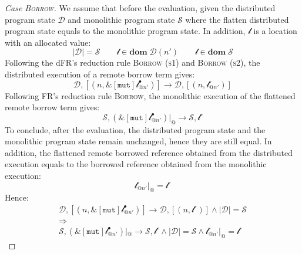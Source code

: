 \begin{proof}[Case \textsc{\emph{Borrow}}]
We assume that before the evaluation, given the distributed program state $\mathcal{D}$ and monolithic program state $\mathcal{S}$ where the flatten distributed program state equals to the monolithic program state. In addition, $\mathscr{l}$ is a location with an allocated value:
\[
|\mathcal{D}| = \mathcal{S} \quad\quad \mathscr{l} \in \textbf{dom}\; \mathcal{D}(n') \quad\quad \mathscr{l} \in \textbf{dom}\; \mathcal{S}
\]
Following the dFR's reduction rule \textsc{Borrow (s1)} and \textsc{Borrow (s2)}, the distributed execution of a remote borrow term gives:
\[
\mathcal{D}, [(n, \&[\texttt{mut}]\mathscr{l}^\bullet_{@n'})] \longrightarrow \mathcal{D}, [(n, \mathscr{l}^\circ_{@n'})]
\]
Following FR's reduction rule \textsc{Borrow}, the monolithic execution of the flattened remote borrow term gives:
\[
\mathcal{S}, (\&[\texttt{mut}]\mathscr{l}^\bullet_{@n'})|_@ \longrightarrow \mathcal{S}, \mathscr{l}^\circ
\]
To conclude, after the evaluation, the distributed program state and the monolithic program state remain unchanged, hence they are still equal. In addition, the flattened remote borrowed reference obtained from the distributed execution equals to the borrowed reference obtained from the monolithic execution:
\[
\mathscr{l}^\circ_{@n'}|_@ = \mathscr{l}^\circ
\]
Hence:
\begin{gather*}
\mathcal{D}, [(n, \&[\texttt{mut}]\mathscr{l}^\bullet_{@n'})] \longrightarrow \mathcal{D}, [(n, \mathscr{l}^\circ)] \land |\mathcal{D}| = \mathcal{S} \\\Rightarrow\\ \mathcal{S}, (\&[\texttt{mut}]\mathscr{l}^\bullet_{@n'})|_@ \longrightarrow \mathcal{S}, \mathscr{l}^\circ \land |\mathcal{D}| = \mathcal{S} \land \mathscr{l}^\circ_{@n'}|_@ = \mathscr{l}^\circ
\end{gather*}
\end{proof}
